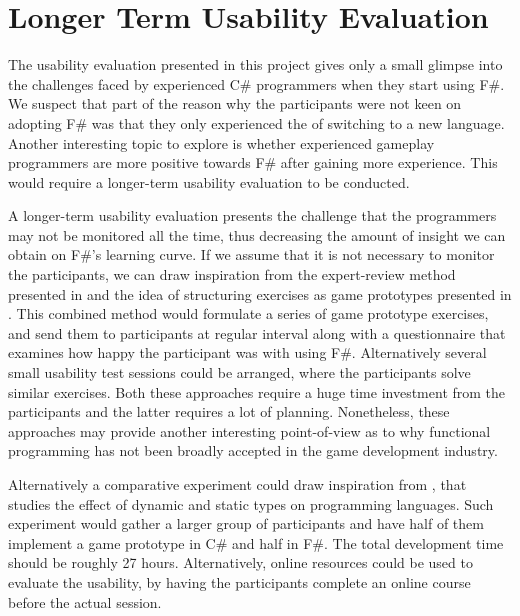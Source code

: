 \section{Longer Term Usability Evaluation}\label{sec:long-term}
The usability evaluation presented in this project gives only a small glimpse into the challenges faced by experienced C\# programmers when they start using F\#. We suspect that part of the reason why the participants were not keen on adopting F\# was that they only experienced the  of switching to a new language. Another interesting topic to explore is whether experienced gameplay programmers are more positive towards F\# after gaining more experience. This would require a longer-term usability evaluation to be conducted.

A longer-term usability evaluation presents the challenge that the programmers may not be monitored all the time, thus decreasing the amount of insight we can obtain on F\#'s learning curve. If we assume that it is not necessary to monitor the participants, we can draw inspiration from the expert-review method presented in \cite{nanz2013examining} and the idea of structuring exercises as game prototypes presented in \cite{bolhuis2019gameplay}. This combined method would formulate a series of game prototype exercises, and send them to participants at regular interval along with a questionnaire that examines how happy the participant was with using F\#. Alternatively several small usability test sessions could be arranged, where the participants solve similar exercises. Both these approaches require a huge time investment from the participants and the latter requires a lot of planning. Nonetheless, these approaches may provide another interesting point-of-view as to why functional programming has not been broadly accepted in the game development industry.

Alternatively a comparative experiment could draw inspiration from \cite{hanenberg2010experiment}, that studies the effect of dynamic and static types on programming languages. Such experiment would gather a larger group of participants and have half of them implement a game prototype in C\# and half in F\#. The total development time should be roughly 27 hours\cite{hanenberg2010experiment}. Alternatively, online resources could be used to evaluate the usability, by having the participants complete an online course before the actual session.

